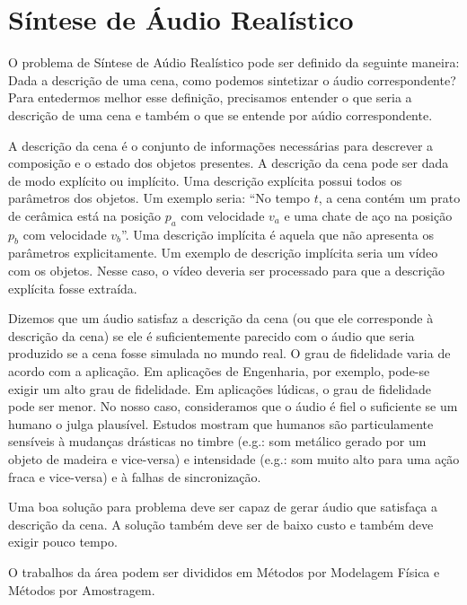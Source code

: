 \chapter{Síntese de Áudio Realístico}

O problema de Síntese de Aúdio Realístico pode ser definido da seguinte maneira: Dada a descrição de uma cena, como podemos sintetizar o áudio correspondente? Para entedermos melhor esse definição, precisamos entender o que seria a descrição de uma cena e também o que se entende por aúdio correspondente.

A descrição da cena é o conjunto de informações necessárias para descrever a composição e o estado dos objetos presentes. A descrição da cena pode ser dada de modo explícito ou implícito. Uma descrição explícita possui todos os parâmetros dos objetos. Um exemplo seria: ``No tempo $t$, a cena contém um prato de cerâmica está na posição $p_a$ com velocidade $v_a$ e uma chate de aço na posição $p_b$ com velocidade $v_b$''. Uma descrição implícita é aquela que não apresenta os parâmetros explicitamente. Um exemplo de descrição implícita seria um vídeo com os objetos. Nesse caso, o vídeo deveria ser processado para que a descrição explícita fosse extraída.

Dizemos que um áudio satisfaz a descrição da cena (ou que ele corresponde à descrição da cena) se ele é suficientemente parecido com o áudio que seria produzido se a cena fosse simulada no mundo real. O grau de fidelidade varia de acordo com a aplicação. Em aplicações de Engenharia, por exemplo, pode-se exigir um alto grau de fidelidade. Em aplicações lúdicas, o grau de fidelidade pode ser menor. No nosso caso, consideramos que o áudio é fiel o suficiente se um humano o julga plausível. Estudos mostram que humanos são particulamente sensíveis à mudanças drásticas no timbre (e.g.: som metálico gerado por um objeto de madeira e vice-versa) e intensidade (e.g.: som muito alto para uma ação fraca e vice-versa) e à falhas de sincronização\cite{bonebright2012were}.

Uma boa solução para problema deve ser capaz de gerar áudio que satisfaça a descrição da cena. A solução também deve ser de baixo custo e também deve exigir pouco tempo.

O trabalhos da área podem ser divididos em Métodos por Modelagem Física e Métodos por Amostragem.






